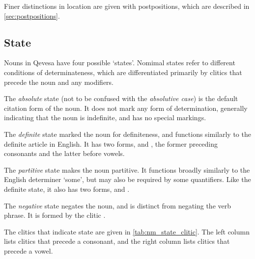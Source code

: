 \documentclass[grammar]{subfiles}
\begin{document}
  Finer distinctions in location are given with postpositions, which are
  described in \cref{sec:postpositions}.

  \subsection{State}
  \label{ssec:nm_state}

  Nouns in Qevesa have four possible ‘states’.  Nomimal states refer to
  different conditions of determinateness, which are differentiated primarily
  by clitics that precede the noun and any modifiers. 

  The \emph{absolute} state (not to be confused with the \emph{absolutive
    case}) is the default citation form of the noun.  It does not mark any form
  of determination, generally indicating that the noun is indefinite, and has
  no special markings.

  The \emph{definite} state marked the noun for definiteness, and functions
  similarly to the definite article in English. 
  It has two forms,  and , the former preceding consonants
  and the latter before vowels.  

  The \emph{partitive} state makes the noun partitive.  It functions broadly
  similarly to the English determiner ‘some’, but may also be required by some
  quantifiers. 
  Like the definite state, it also has two forms,  and
  .   

  The \emph{negative} state negates the noun, and is distinct from negating the
  verb phrase.  It is formed by the clitic . 

  The clitics that indicate state are given in \cref{tab:nm_state_clitic}.
  The left column lists clitics that precede a consonant, and the right column
  lists clitics that precede a vowel.

\end{document}
